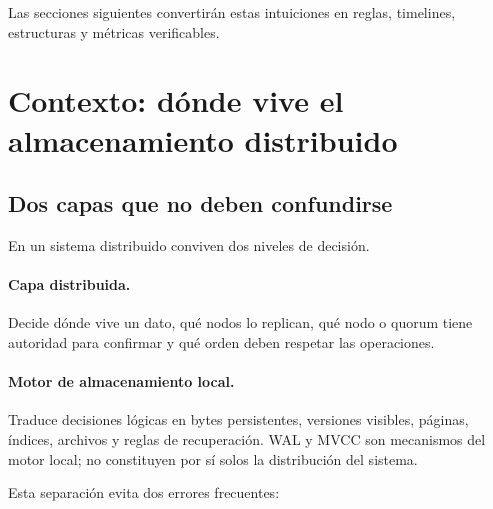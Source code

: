 \documentclass[variant=apuntes,cover=institutional,mode=screen]{ua-engineering-v6-article}
\begin{document}
Las secciones siguientes convertirán estas intuiciones en reglas, timelines, estructuras y métricas verificables.

\section{Contexto: dónde vive el almacenamiento distribuido}

\subsection{Dos capas que no deben confundirse}

En un sistema distribuido conviven dos niveles de decisión.

\begin{center}
\end{center}

\paragraph{Capa distribuida.} Decide dónde vive un dato, qué nodos lo replican, qué nodo o quorum tiene autoridad para confirmar y qué orden deben respetar las operaciones.

\paragraph{Motor de almacenamiento local.} Traduce decisiones lógicas en bytes persistentes, versiones visibles, páginas, índices, archivos y reglas de recuperación. WAL y MVCC son mecanismos del motor local; no constituyen por sí solos la distribución del sistema.

Esta separación evita dos errores frecuentes:
\end{document}
